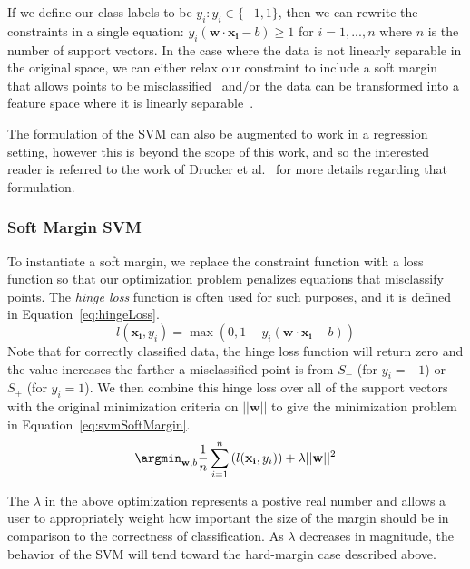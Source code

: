If we define our class labels to be $y_i: y_i \in \{-1,1\}$, then we can rewrite the constraints in a single equation: $y_i(\mathbf{w} \cdot \mathbf{x_i} - b ) \geq 1$ for $i=1,...,n$ where $n$ is the number of support vectors.
%
In the case where the data is not linearly separable in the original space, we can either relax our constraint to include a soft margin that allows points to be misclassified~\cite{CortesVapnik1995} and/or the data can be transformed into a feature space where it is linearly separable~\cite{BoserGuyonVapnik1992}.

The formulation of the SVM can also be augmented to work in a regression setting, however this is beyond the scope of this work, and so the interested reader is referred to the work of Drucker et al.~\cite{DruckerBurgesKaufman1997} for more details regarding that formulation.

\subsubsection{Soft Margin SVM}

To instantiate a soft margin, we replace the constraint function with a loss function so that our optimization problem penalizes equations that misclassify points.
%
The \emph{hinge loss} function is often used for such purposes, and it is defined in Equation~\ref{eq:hingeLoss}.
%
\begin{equation}
l(\mathbf{x_i},y_i) = \max(0,1-y_i(\mathbf{w} \cdot \mathbf{x_i} - b))
\label{eq:hingeLoss}
\end{equation}
%
Note that for correctly classified data, the hinge loss function will return zero and the value increases the farther a misclassified point is from $S_-$ (for $y_i=-1$) or $S_+$ (for $y_i=1$).
%
We then combine this hinge loss over all of the support vectors with the original minimization criteria on $||\mathbf{w}||$ to give the minimization problem in Equation~\ref{eq:svmSoftMargin}.
\begin{equation}
\argmin_{\mathbf{w},b}\frac{1}{n}\sum_{i=1}^n \left(l(\mathbf{x_i},y_i)\right) + \lambda ||\mathbf{w}||^2
\label{eq:svmSoftMargin}
\end{equation}

The $\lambda$ in the above optimization represents a postive real number and allows a user to appropriately weight how important the size of the margin should be in comparison to the correctness of classification.
%
As $\lambda$ decreases in magnitude, the behavior of the SVM will tend toward the hard-margin case described above.

